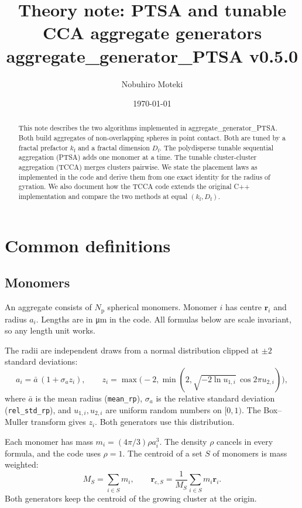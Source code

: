 \documentclass[11pt,a4paper]{article}
\title{Theory note: PTSA and tunable CCA aggregate generators\\
\large aggregate\_generator\_PTSA v0.5.0}
\author{Nobuhiro Moteki}
\date{\today}
\newcommand{\abar}{\bar{a}}
\newcommand{\Df}{D_\text{f}}
\newcommand{\kf}{k_\text{f}}
\begin{document}
\maketitle

\begin{abstract}
This note describes the two algorithms implemented in aggregate\_generator\_PTSA.
Both build aggregates of non-overlapping spheres in point contact.
Both are tuned by a fractal prefactor $\kf$ and a fractal dimension $\Df$.
The polydisperse tunable sequential aggregation (PTSA) adds one monomer at a time.
The tunable cluster-cluster aggregation (TCCA) merges clusters pairwise.
We state the placement laws as implemented in the code and derive them from one exact identity for the radius of gyration.
We also document how the TCCA code extends the original C++ implementation and compare the two methods at equal $(\kf, \Df)$.
\end{abstract}

\tableofcontents

\section{Common definitions}
\label{sec:common}

\subsection{Monomers}
\label{sec:monomers}

An aggregate consists of $N_\text{p}$ spherical monomers.
Monomer $i$ has centre $\bm{r}_i$ and radius $a_i$.
Lengths are in \si{\micro\meter} in the code.
All formulas below are scale invariant, so any length unit works.

The radii are independent draws from a normal distribution clipped at $\pm 2$ standard deviations:
\begin{equation}
  a_i = \abar\,(1 + \sigma_a z_i), \qquad
  z_i = \max\!\bigl(-2, \min(2, \sqrt{-2\ln u_{1,i}}\,\cos 2\pi u_{2,i})\bigr),
  \label{eq:radius-distribution}
\end{equation}
where $\abar$ is the mean radius (\texttt{mean\_rp}), $\sigma_a$ is the relative standard deviation (\texttt{rel\_std\_rp}), and $u_{1,i}, u_{2,i}$ are uniform random numbers on $[0, 1)$.
The Box--Muller transform gives $z_i$.
Both generators use this distribution.

Each monomer has mass $m_i = (4\pi/3)\rho a_i^3$.
The density $\rho$ cancels in every formula, and the code uses $\rho = 1$.
The centroid of a set $S$ of monomers is mass weighted:
\begin{equation}
  M_S = \sum_{i \in S} m_i, \qquad
  \bm{r}_{\text{c},S} = \frac{1}{M_S} \sum_{i \in S} m_i \bm{r}_i .
  \label{eq:centroid}
\end{equation}
Both generators keep the centroid of the growing cluster at the origin.
\end{document}
